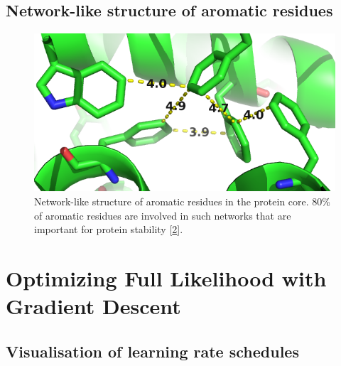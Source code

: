 \documentclass[12pt,a4paper,twoside]{book}
\theoremstyle{definition}
\theoremstyle{definition}
\theoremstyle{remark}
\begin{document}
\section{Network-like structure of aromatic
residues}\label{aromatic-network}






\begin{figure}
\includegraphics[width=0.5\linewidth]{img/coupling_matrix_analysis/aromatic_bundle} \caption{Network-like structure of aromatic
residues in the protein core. 80\% of aromatic residues are involved in
such networks that are important for protein stability
{[}\protect\hyperlink{ref-Burley1985}{2}{]}.}\label{fig:aromatic-network}
\end{figure}

\chapter{Optimizing Full Likelihood with Gradient
Descent}\label{optimizing-full-likelihood-with-gradient-descent}

\section{Visualisation of learning rate
schedules}\label{visualisation-of-learning-rate-schedules}
\end{document}
